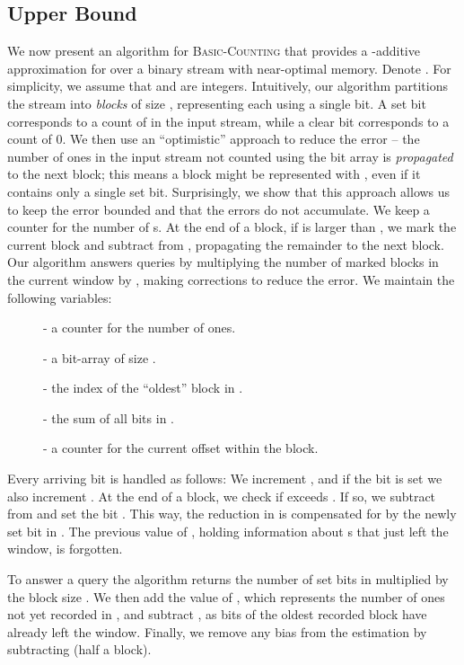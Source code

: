 \subsection{Upper Bound}

We now present an algorithm for \textsc{Basic-Counting} that provides a -additive approximation  for  over a binary stream with near-optimal memory.
Denote .
For simplicity, we assume that  and  are integers.
Intuitively, our algorithm partitions the stream into  \emph{blocks} of size , representing each using a single bit. A set bit corresponds to a count of  in the input stream, while a clear bit corresponds to a count of 0. We then use an ``optimistic'' approach to reduce the error -- the number of ones in the input stream not counted using the bit array is \emph{propagated} to the next block; this means a block might be represented with , even if it contains only a single set bit. Surprisingly, we show that this approach allows us to keep the error bounded and that the errors do not accumulate.
We keep a counter  for the number of s.
At the end of a block, if  is larger than , we mark the current block and subtract  from , propagating the remainder to the next block.
Our algorithm answers queries by multiplying the number of marked blocks in the current window by , making corrections to reduce the error.
We maintain the following variables:
\begin{description}
\item[] - a counter for the number of ones.
\item[] - a bit-array of size .
\item[] - the index of the ``oldest'' block in .
\item[] - the sum of all bits in .
\item[] - a counter for the current offset within the block.
\end{description}
\normalsize
Every arriving bit is handled as follows: We increment , and if the bit is set we also increment .
At the end of a block, we check if  exceeds . If so, we subtract  from  and set the bit .
This way, the reduction in  is compensated for by the newly set bit in .
The previous value of , holding information about s that just left the window, is forgotten.

To answer a query the algorithm returns the number of set bits in  multiplied by the block size .
We then add the value of , which represents the number of ones not yet recorded in , and subtract , as  bits of the oldest recorded block have already left the window.
Finally, we remove any bias from the estimation by subtracting  (half a block).

